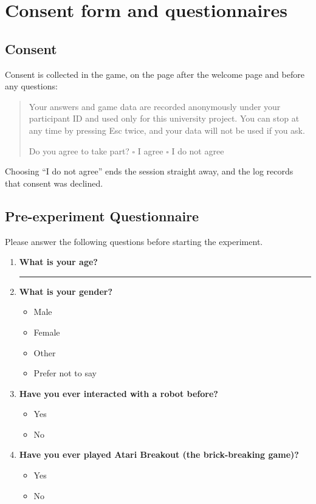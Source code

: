 \section{Consent form and questionnaires}
\label{app:questionnaires}
\subsection{Consent}
Consent is collected in the game, on the page after the welcome page and before any questions:

\begin{quote}
Your answers and game data are recorded anonymously under your participant ID and used only for this university project. You can stop at any time by pressing Esc twice, and your data will not be used if you ask.

Do you agree to take part? \quad $\square$ I agree \quad $\square$ I do not agree
\end{quote}

Choosing ``I do not agree'' ends the session straight away, and the log records that consent was declined.

\subsection{Pre-experiment Questionnaire}

Please answer the following questions before starting the experiment.

\begin{enumerate}[leftmargin=*, itemsep=0.8em]

    \item \textbf{What is your age?}

    \rule{4cm}{0.4pt}

    \item \textbf{What is your gender?}

    \begin{itemize}[label=$\square$, nosep]
        \item Male
        \item Female
        \item Other
        \item Prefer not to say
    \end{itemize}

    \item \textbf{Have you ever interacted with a robot before?}

    \begin{itemize}[label=$\square$, nosep]
        \item Yes
        \item No
    \end{itemize}

    \item \textbf{Have you ever played Atari Breakout (the brick-breaking game)?}

    \begin{itemize}[label=$\square$, nosep]
        \item Yes
        \item No
    \end{itemize}

\end{enumerate}


